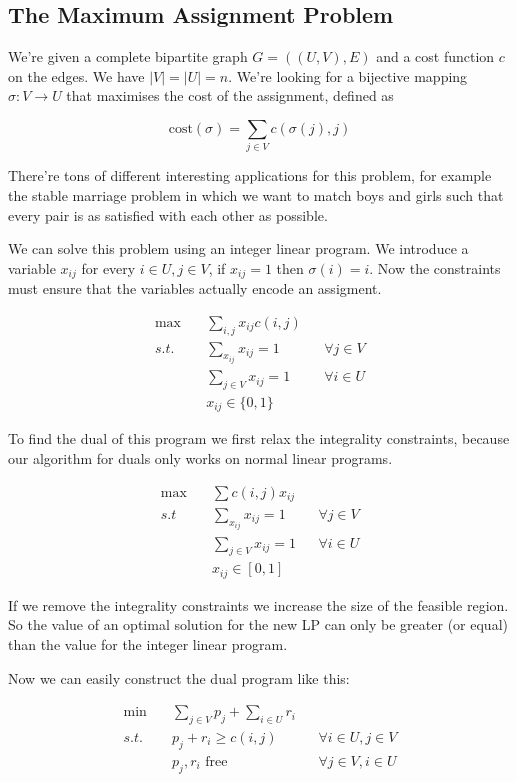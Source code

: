 \subsection{The Maximum Assignment Problem}\label{sec:maxAssignment}

We're given a complete bipartite graph $G=((U,V),E)$ and a cost function $c$ on the edges. We have $|V|=|U|=n$. We're looking for a bijective mapping $\sigma : V \rightarrow U$ that maximises the cost of the assignment, defined as 

\[\text{cost}(\sigma) = \sum_{j\in V} c(\sigma(j),j)\]

There're tons of different interesting applications for this problem, for example the stable marriage problem in which we want to match boys and girls such that every pair is as satisfied with each other as possible.

We can solve this problem using an integer linear program. We introduce a variable $x_{ij}$ for every $i\in U,j\in V$, if $x_{ij}=1$ then $\sigma(i)=i$. Now the constraints must ensure that the variables actually encode an assigment.

\begin{align*}
\max \quad &  \sum_{i,j} x_{ij} c(i,j)\\
s.t. & \sum_{x_{ij}} x_{ij}=1 && \forall j\in V \\
&\sum_{j\in V} x_{ij} = 1 && \forall i\in U\\
&x_{ij}\in \{0,1\}
\end{align*}

To find the dual of this program we first relax the integrality constraints, because our algorithm for duals only works on normal linear programs.

\begin{align*}
\max \quad & \sum c(i,j)x_{ij}\\
s.t & \sum_{x_{ij}} x_{ij}=1 && \forall j\in V \\
	&\sum_{j\in V} x_{ij} = 1 && \forall i\in U\\
	&x_{ij} \in [0,1]
\end{align*}

If we remove the integrality constraints we increase the size of the feasible region. So the value of an optimal solution for the new LP can only be greater (or equal) than the value for the integer linear program. %

Now we can easily construct the dual program like this:

\begin{align*}
\min \quad & \sum_{j\in V} p_j + \sum_{i\in U} r_i\\
s.t.\quad & p_j+r_i\geq c(i,j) &&\forall i\in U, j\in V\\
& p_j,r_i \text{ free} &&\forall j\in V,i\in U
\end{align*}

